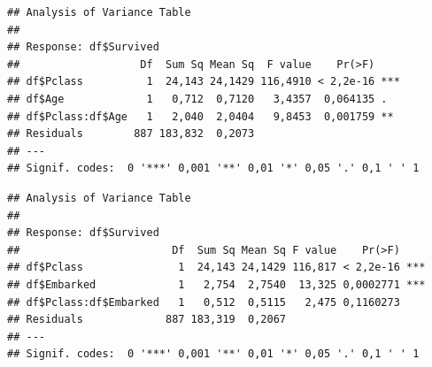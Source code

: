 \documentclass[]{article}
\newenvironment{Shaded}{\begin{snugshade}}{\end{snugshade}}
\newcommand{\KeywordTok}[1]{\textcolor[rgb]{0.13,0.29,0.53}{\textbf{#1}}}
\newcommand{\StringTok}[1]{\textcolor[rgb]{0.31,0.60,0.02}{#1}}
\newcommand{\OperatorTok}[1]{\textcolor[rgb]{0.81,0.36,0.00}{\textbf{#1}}}
\newcommand{\NormalTok}[1]{#1}
\begin{document}
\begin{Shaded}
\end{Shaded}

\begin{verbatim}
## Analysis of Variance Table
## 
## Response: df$Survived
##                   Df  Sum Sq Mean Sq  F value    Pr(>F)    
## df$Pclass          1  24,143 24,1429 116,4910 < 2,2e-16 ***
## df$Age             1   0,712  0,7120   3,4357  0,064135 .  
## df$Pclass:df$Age   1   2,040  2,0404   9,8453  0,001759 ** 
## Residuals        887 183,832  0,2073                       
## ---
## Signif. codes:  0 '***' 0,001 '**' 0,01 '*' 0,05 '.' 0,1 ' ' 1
\end{verbatim}

\begin{Shaded}
\end{Shaded}

\begin{verbatim}
## Analysis of Variance Table
## 
## Response: df$Survived
##                        Df  Sum Sq Mean Sq F value    Pr(>F)    
## df$Pclass               1  24,143 24,1429 116,817 < 2,2e-16 ***
## df$Embarked             1   2,754  2,7540  13,325 0,0002771 ***
## df$Pclass:df$Embarked   1   0,512  0,5115   2,475 0,1160273    
## Residuals             887 183,319  0,2067                      
## ---
## Signif. codes:  0 '***' 0,001 '**' 0,01 '*' 0,05 '.' 0,1 ' ' 1
\end{verbatim}

\begin{Shaded}
\end{Shaded}
\end{document}
